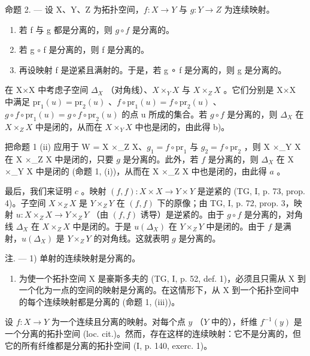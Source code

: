 命题 2. --- 设 X、Y、Z 为拓扑空间，\(f\colon X \to Y\) 与 \(g\colon Y \to Z\) 为连续映射。

\begin{enumerate}
\def\labelenumi{\alph{enumi})}
\item
  若 f 与 g 都是分离的，则 \(g \circ f\) 是分离的。
\item
若 g \(\circ\) f 是分离的，则 f 是分离的。
\item
  再设映射 f 是逆紧且满射的。于是，若 g ∘ f 是分离的，则 g 是分离的。
\end{enumerate}

在 X×X 中考虑子空间 \(\Delta_{X}\) （对角线）、\(X \times_Y X\) 与 \(X \times_Z X\) 。它们分别是 X×X 中满足 \(\mathrm{pr}_{1}(u)=\mathrm{pr}_{2}(u)\) 、\(f\circ\mathrm{pr}_{1}(u)=f\circ\mathrm{pr}_{2}(u)\) 、\(g\circ f\circ\mathrm{pr}_{1}(u)=g\circ f\circ\mathrm{pr}_{2}(u)\) 的点 u 所成的集合。若 \(g\circ f\) 是分离的，则 \(\Delta_{X}\) 在 \(X \times_Z X\) 中是闭的，从而在 \(X \times_Y X\) 中也是闭的，由此得 b)。

把命题 1 (ii) 应用于 W = X ×\_Z X、\(g_1 = f \circ \text{pr}_1\) 与 \(g_2 = f \circ \text{pr}_2\) ，则 X ×\_Y X 在 X ×\_Z X 中是闭的，只要 \(g\) 是分离的。此外，若 \(f\) 是分离的，则 \(\Delta_X\) 在 X ×\_Y X 中是闭的 (命题 1, (i))，从而在 X ×\_Z X 中也是闭的，由此得 \(a\) 。

最后，我们来证明 \(c\) 。映射 \((f, f) \colon X \times X \to Y \times Y\) 是逆紧的 (TG, I, p. 73, prop. 4)。子空间 \(X \times_Z X\) 是 \(Y \times_Z Y\) 在 \((f, f)\) 下的原像；由 TG, I, p. 72, prop. 3，映射 \(u \colon X \times_Z X \to Y \times_Z Y\) （由 \((f, f)\) 诱导）是逆紧的。由于 \(g \circ f\) 是分离的，对角线 \(\Delta_X\) 在 \(X \times_Z X\) 中是闭的。于是 \(u(\Delta_X)\) 在 \(Y \times_Z Y\) 中是闭的。由于 \(f\) 是满射，\(u(\Delta_X)\) 是 \(Y \times_Z Y\) 的对角线。这就表明 \(g\) 是分离的。

注. --- 1) 单射的连续映射是分离的。

\begin{enumerate}
\def\labelenumi{\arabic{enumi})}
\setcounter{enumi}{1}
\tightlist
\item
  为使一个拓扑空间 X 是豪斯多夫的 (TG, I, p. 52, def. 1)，必须且只需从 X 到一个化为一点的空间的映射是分离的。在这情形下，从 X 到一个拓扑空间中的每个连续映射都是分离的 (命题 1, (iii))。
\end{enumerate}

设 \(f\colon X \to Y\) 为一个连续且分离的映射。对每个点 \(y\) （\(Y\) 中的），纤维 \(f^{-1}(y)\) 是一个分离的拓扑空间 (loc. cit.)。然而，存在这样的连续映射：它不是分离的，但它的所有纤维都是分离的拓扑空间 (I, p. 140, exerc. 1)。

